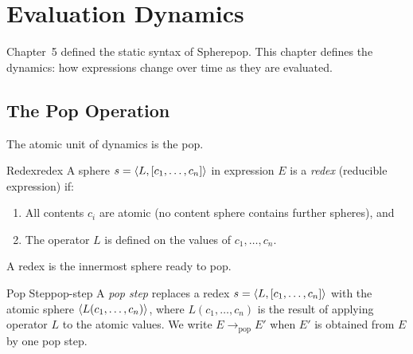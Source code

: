 
\chapter{Evaluation Dynamics}



Chapter~5 defined the static syntax of Spherepop. This chapter defines
the dynamics: how expressions change over time as they are evaluated.

\section{The Pop Operation}

The atomic unit of dynamics is the pop.

\begin{definition}{Redex}{redex}
  A sphere $s = \langle L, [c_1,\ldots,c_n] \rangle$ in expression $E$ is
  a \emph{redex} (reducible expression) if:
  \begin{enumerate}
    \item All contents $c_i$ are atomic (no content sphere contains
          further spheres), and
    \item The operator $L$ is defined on the values of $c_1,\ldots,c_n$.
  \end{enumerate}
  A redex is the innermost sphere ready to pop.
\end{definition}

\begin{definition}{Pop Step}{pop-step}
  A \emph{pop step} replaces a redex
  $s = \langle L, [c_1,\ldots,c_n] \rangle$ with the atomic sphere
  $\langle L(c_1,\ldots,c_n) \rangle$, where $L(c_1,\ldots,c_n)$ is the
  result of applying operator $L$ to the atomic values.
  We write $E \to_\text{pop} E'$ when $E'$ is obtained from $E$
  by one pop step.
\end{definition}

